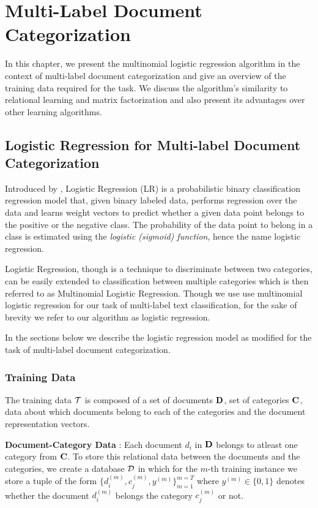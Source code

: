 \chapter{Multi-Label Document Categorization}
\label{chapter:mltextcat}
In this chapter, we present the multinomial logistic regression algorithm in the context of multi-label document categorization and give an overview of the training data required for the task. We discuss the algorithm's similarity to relational learning and matrix factorization and also present its advantages over other learning algorithms.

\section{Logistic Regression for Multi-label Document Categorization}
\label{sec:lrtc}
Introduced by \citet{hosmer1989applied}, Logistic Regression (LR) is a probabilistic binary classification regression model that, given binary labeled data, performs regression over the data and learns weight vectors to predict whether a given data point belongs to the positive or the negative class. 
The probability of the data point to belong in a class is estimated using the \emph{logistic (sigmoid) function}, hence the name logistic regression.

Logistic Regression, though is a technique to discriminate between two categories, can be easily extended to classification between multiple categories which is then referred to as Multinomial Logistic Regression. 
Though we use use multinomial logistic regression for our task of multi-label text classification, for the sake of brevity we refer to our algorithm as logistic regression.

In the sections below we describe the logistic regression model as modified for the task of multi-label document categorization.

\subsection{Training Data}
\label{sec:trdata_lr}
The training data $\mathcal{T}$ is composed of a set of documents $\mathbf{D}$, set of categories $\mathbf{C}$, data about which documents belong to each of the categories and the document representation vectors.

\textbf{Document-Category Data} : 
Each document $d_{i}$ in $\mathbf{D}$ belongs to atleast one category from $\mathbf{C}$. To store this relational data between the documents and the categories, we create a database $\mathcal{D}$ in which for the $m$-th training instance we store a tuple of the form $\{ d^{(m)}_{i}, c^{(m)}_{j}, y^{(m)}\}^{m=T}_{m=1}$ where $y^{(m)} \in \{0, 1\}$ denotes whether the document $d^{(m)}_{i}$ belongs the category $c^{(m)}_{j}$ or not. 

